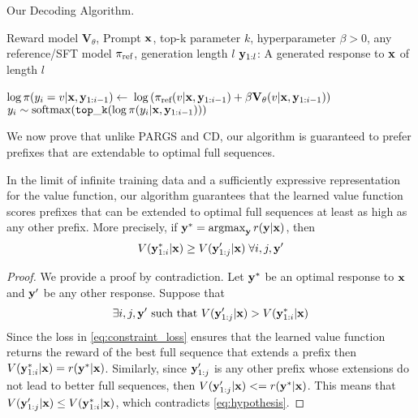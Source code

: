 \begin{algorithm}[t]
    \small
    \caption{Our Decoding Algorithm.}
    \label{alg:rgtg_decode}

    \begin{algorithmic}[1]
        \REQUIRE Reward model $\mathbf{V}_{\theta}$, Prompt ${\mathbf{x}}$, top-k parameter $k$, hyperparameter $\beta > 0$, any reference/SFT model $\pi_\text{ref}$, generation length $l$
        \ENSURE ${\mathbf{y}}_{1:l}$: A generated response to ${\mathbf{x}}$ of length $l$

        \vspace{1em}
        
            \STATE $\log \pi(y_i=v \vert {\mathbf{x}}, {\mathbf{y}}_{1:i-1}) \leftarrow$
            \STATE \qquad\qquad $\log \left(\pi_\text{ref}(v \vert {\mathbf{x}}, {\mathbf{y}}_{1:i-1}) + \beta \mathbf{V}_{\theta}(v \vert {\mathbf{x}}, {\mathbf{y}}_{1:i-1})\right)$
            \STATE $y_{i} \sim \mathrm{softmax}(\mathtt{top\_k}(\log \pi(y_i \vert {\mathbf{x}}, {\mathbf{y}}_{1:i-1})))$
        \ENDFOR  
    \end{algorithmic}
\end{algorithm}

We now prove that unlike PARGS and CD, our algorithm is guaranteed to prefer prefixes that are extendable to optimal full sequences.


\begin{theorem}
In the limit of infinite training data and a sufficiently expressive representation for the value function, our algorithm guarantees that the learned value function scores prefixes that can be extended to optimal full sequences at least as high as any other prefix.  More precisely, if ${\mathbf{y}}^* = \operatorname*{argmax}_{{\mathbf{y}}} r({\mathbf{y}}|{\mathbf{x}})$, then 
\begin{equation}
V({\mathbf{y}}^*_{1:i}|{\mathbf{x}}) \ge V({\mathbf{y}}'_{1:j}|{\mathbf{x}}) \; \forall i,j,{\mathbf{y}}'
\end{equation}
\end{theorem}

\begin{proof}
We provide a proof by contradiction.  Let ${\mathbf{y}}^*$ be an optimal response to ${\mathbf{x}}$ and ${\mathbf{y}}'$ be any other response.  Suppose that
\begin{equation}
    \exists i,j,{\mathbf{y}}' \mbox{ such that } V({\mathbf{y}}'_{1:j}|{\mathbf{x}}) > V({\mathbf{y}}^*_{1:i}|{\mathbf{x}}) \label{eq:hypothesis}
\end{equation}  
Since the loss in \eqref{eq:constraint_loss} ensures that the learned value function returns the reward of the best full sequence that extends a prefix then $V({\mathbf{y}}^*_{1:i}|{\mathbf{x}}) = r({\mathbf{y}}^*|{\mathbf{x}})$.  Similarly, since ${\mathbf{y}}'_{1:j}$ is any other prefix whose extensions do not lead to better full sequences, then $V({\mathbf{y}}'_{1:j}|{\mathbf{x}}) <= r({\mathbf{y}}^*|{\mathbf{x}})$.  This means that $V({\mathbf{y}}'_{1:j}|{\mathbf{x}}) \le V({\mathbf{y}}^*_{1:i}|{\mathbf{x}})$, which contradicts \eqref{eq:hypothesis}.
\end{proof}


